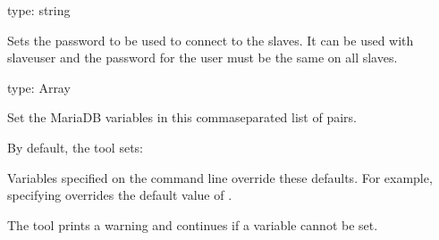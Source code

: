 \documentclass[letterpaper,10pt,english]{sphinxmanual}
\begin{document}

\begin{fulllineitems}
\label{\detokenize{mariadb-archiver:cmdoption-mariadb-archiver-slave-password}}
\sphinxAtStartPar
type: string

\sphinxAtStartPar
Sets the password to be used to connect to the slaves.
It can be used with \textendash{}slave\sphinxhyphen{}user and the password for the user must be the same
on all slaves.

\end{fulllineitems}


\begin{fulllineitems}
\label{\detokenize{mariadb-archiver:cmdoption-mariadb-archiver-set-vars}}
\sphinxAtStartPar
type: Array

\sphinxAtStartPar
Set the MariaDB variables in this comma\sphinxhyphen{}separated list of  pairs.

\sphinxAtStartPar
By default, the tool sets:

\begin{sphinxVerbatim}[commandchars=\\\{\}]
\end{sphinxVerbatim}

\sphinxAtStartPar
Variables specified on the command line override these defaults.  For
example, specifying  overrides the default
value of .

\sphinxAtStartPar
The tool prints a warning and continues if a variable cannot be set.

\end{fulllineitems}
\end{document}
